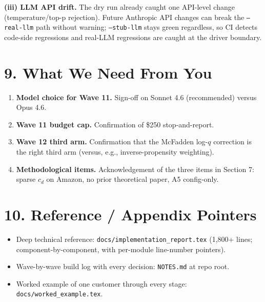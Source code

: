 \documentclass[11pt]{article}
\begin{document}
\textbf{(iii) LLM API drift.} The dry run already caught one API-level change (temperature/top-p rejection). Future Anthropic API changes can break the \texttt{--real-llm} path without warning; \texttt{--stub-llm} stays green regardless, so CI detects code-side regressions and real-LLM regressions are caught at the driver boundary.

\section*{9. What We Need From You}

\begin{enumerate}
\item \textbf{Model choice for Wave 11.} Sign-off on Sonnet 4.6 (recommended) versus Opus 4.6.
\item \textbf{Wave 11 budget cap.} Confirmation of \$250 stop-and-report.
\item \textbf{Wave 12 third arm.} Confirmation that the McFadden log-$q$ correction is the right third arm (versus, e.g., inverse-propensity weighting).
\item \textbf{Methodological items.} Acknowledgement of the three items in Section 7: sparse $c_d$ on Amazon, no prior theoretical paper, A5 config-only.
\end{enumerate}

\section*{10. Reference / Appendix Pointers}

\begin{itemize}
\item[--] Deep technical reference: \texttt{docs/implementation\_report.tex} (1{,}800+ lines; component-by-component, with per-module line-number pointers).
\item[--] Wave-by-wave build log with every decision: \texttt{NOTES.md} at repo root.
\item[--] Worked example of one customer through every stage: \texttt{docs/worked\_example.tex}.
\end{itemize}
\end{document}

